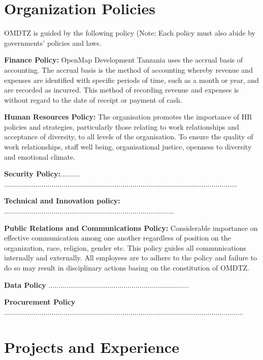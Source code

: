 \documentclass[a4paper,12pt,twoside]{article}
\begin{document}
\newpage
\section{Organization Policies}
\label{policies}

OMDTZ is guided by the following policy (Note; Each policy must also abide by governments’ policies and laws.


\textbf{Finance Policy:} OpenMap Development Tanzania uses the accrual basis of accounting. The accrual basis is the method of accounting whereby revenue and expenses are identified with specific periods of time, such as a month or year, and are recorded as incurred.  This method of recording revenue and expenses is without regard to the date of receipt or payment of cash.

\textbf{Human Resources Policy:} The organisation promotes the importance of HR policies and strategies, particularly those relating to work relationships and acceptance of diversity, to all levels of the organisation. To ensure the quality of work relationships, staff well being, organisational justice, openness to diversity and emotional climate.


\textbf{Security Policy:}.......... ......................................................................................................................


\textbf{Technical and Innovation policy:}
......................................................................................

\textbf{Public Relations and Communications Policy:} Considerable importance on effective communication among one another regardless of position on the organization, race, religion, gender etc. This policy guides all communications internally and externally. All employees are to adhere to the policy and failure to do so may result in disciplinary actions basing on the constitution of OMDTZ.


\textbf{Data Policy}     .......................................................................


\textbf{Procurement Policy}       .........................................................................................................................

\newpage
\section{Projects and Experience}
\label{projectsandexperience}
\end{document}
